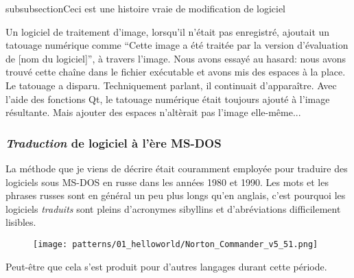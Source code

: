 subsubsection{Ceci est une histoire vraie de modification de logiciel}
\myindex{\SoftwareCracking}

Un logiciel de traitement d'image, lorsqu'il n'était pas enregistré, ajoutait un
tatouage numérique comme ``Cette image a été traitée par la version d'évaluation
de [nom du logiciel]'', à travers l'image.
Nous avons essayé au hasard: nous avons trouvé cette chaîne dans le fichier exécutable
et avons mis des espaces à la place.
Le tatouage a disparu.
Techniquement parlant, il continuait d'apparaître.
Avec l'aide des fonctions Qt, le tatouage numérique était toujours ajouté à l'image
résultante.
Mais ajouter des espaces n'altèrait pas l'image elle-même...

\subsubsection{\emph{Traduction} de logiciel à l'ère MS-DOS}

La méthode que je viens de décrire était couramment employée pour traduire des logiciels sous MS-DOS en russe dans les
années 1980 et 1990.
Les mots et les phrases russes sont en général un peu plus longs qu'en anglais, c'est pourquoi les logiciels
\emph{traduits} sont pleins d'acronymes sibyllins et d'abréviations difficilement lisibles.

\begin{figure}[H]
\centering
\texttt{[image: patterns/01\_helloworld/Norton\_Commander\_v5\_51.png]}
\caption{\FRph{}}
\end{figure}

Peut-être que cela s'est produit pour d'autres langages durant cette période.

